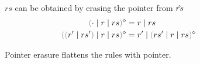 
\begin{figure}[ht]

        {$rs$ can be obtained by erasing the pointer from $\hat{rs}$}
\begin{align*}
  \rmpointer{\zruls{\cdot}{r}{rs}} &= \hrules{r}{rs} \\
  \rmpointer{\zruls{\hrulesP{r'}{rs'}}{r}{rs}} &= \hrules{r'}{\rmpointer{\zruls{rs'}{r}{rs}}}
\end{align*}

\caption{Pointer erasure flattens the rules with pointer.}
\label{fig:pointer-eraser}
\end{figure}
